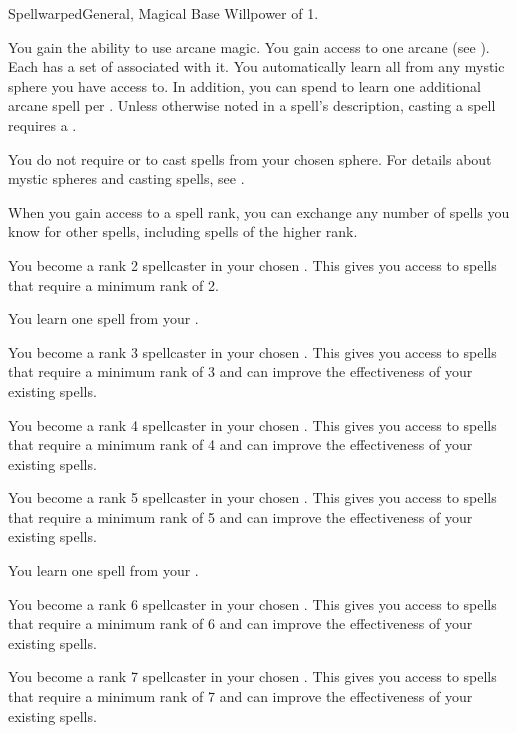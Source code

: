     \begin{feat}{Spellwarped}{General, Magical}
        \featpre Base Willpower of 1.

         You gain the ability to use arcane magic.
        You gain access to one arcane  (see ).
        Each  has a set of  associated with it.
        You automatically learn all  from any mystic sphere you have access to.
        In addition, you can spend  to learn one additional arcane spell per .
        Unless otherwise noted in a spell's description, casting a spell requires a .

        You do not require  or  to cast spells from your chosen sphere.
        For details about mystic spheres and casting spells, see .

        When you gain access to a spell rank,
            you can exchange any number of spells you know for other spells,
            including spells of the higher rank.

         You become a rank 2 spellcaster in your chosen .
        This gives you access to spells that require a minimum rank of 2.

         You learn one spell from your .

         You become a rank 3 spellcaster in your chosen .
        This gives you access to spells that require a minimum rank of 3 and can improve the effectiveness of your existing spells.

         You become a rank 4 spellcaster in your chosen .
        This gives you access to spells that require a minimum rank of 4 and can improve the effectiveness of your existing spells.

         You become a rank 5 spellcaster in your chosen .
        This gives you access to spells that require a minimum rank of 5 and can improve the effectiveness of your existing spells.

         You learn one spell from your .

         You become a rank 6 spellcaster in your chosen .
        This gives you access to spells that require a minimum rank of 6 and can improve the effectiveness of your existing spells.

         You become a rank 7 spellcaster in your chosen .
        This gives you access to spells that require a minimum rank of 7 and can improve the effectiveness of your existing spells.
    \end{feat}

